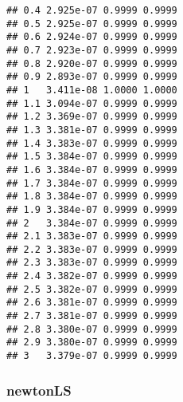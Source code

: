 \documentclass[
  12pt,
]{article}
\begin{document}
\begin{verbatim}
## 0.4 2.925e-07 0.9999 0.9999
## 0.5 2.925e-07 0.9999 0.9999
## 0.6 2.924e-07 0.9999 0.9999
## 0.7 2.923e-07 0.9999 0.9999
## 0.8 2.920e-07 0.9999 0.9999
## 0.9 2.893e-07 0.9999 0.9999
## 1   3.411e-08 1.0000 1.0000
## 1.1 3.094e-07 0.9999 0.9999
## 1.2 3.369e-07 0.9999 0.9999
## 1.3 3.381e-07 0.9999 0.9999
## 1.4 3.383e-07 0.9999 0.9999
## 1.5 3.384e-07 0.9999 0.9999
## 1.6 3.384e-07 0.9999 0.9999
## 1.7 3.384e-07 0.9999 0.9999
## 1.8 3.384e-07 0.9999 0.9999
## 1.9 3.384e-07 0.9999 0.9999
## 2   3.384e-07 0.9999 0.9999
## 2.1 3.383e-07 0.9999 0.9999
## 2.2 3.383e-07 0.9999 0.9999
## 2.3 3.383e-07 0.9999 0.9999
## 2.4 3.382e-07 0.9999 0.9999
## 2.5 3.382e-07 0.9999 0.9999
## 2.6 3.381e-07 0.9999 0.9999
## 2.7 3.381e-07 0.9999 0.9999
## 2.8 3.380e-07 0.9999 0.9999
## 2.9 3.380e-07 0.9999 0.9999
## 3   3.379e-07 0.9999 0.9999
\end{verbatim}

\normalsize

\subsubsection{newtonLS}\label{newtonls-2}

\footnotesize
\end{document}
